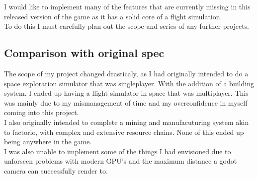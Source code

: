 \documentclass[12pt, DIV=calc]{scrartcl}
\begin{document}
I would like to implement many of the features that are currently missing in this released version of the game as it has a solid core of a flight simulation. \\

To do this I must carefully plan out the scope and series of any further projects. 

\subsection{Comparison with original spec}
The scope of my project changed drasticaly, as I had originally intended to do a space exploration simulator that was singleplayer. With the addition of a building system. I ended up having a flight simulator in space that was multiplayer. This was mainly due to my mismanagement of time and my overconfidence in myself coming into this project.\\

I also originally intended to complete a mining and manufacuturing system akin to factorio, with complex and extensive resource chains. None of this ended up being anywhere in the game. \\

I was also unable to implement some of the things I had envisioned due to unforseen problems with modern GPU's and the maximum distance a godot camera can successfully render to.
\end{document}
